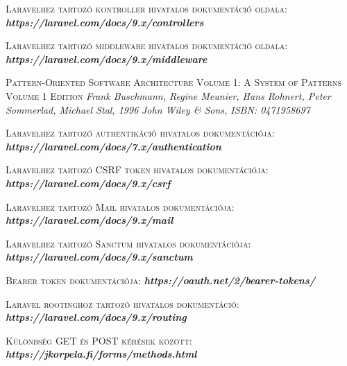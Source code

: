 \documentclass[
]{thesis-ekf}
\theoremstyle{definition}
\theoremstyle{remark}
\begin{document}
\begin{thebibliography}{2}
		\textsc{Laravelhez tartozó kontroller hivatalos dokumentáció oldala:}
		\newline
		\emph{\bf{https://laravel.com/docs/9.x/controllers}}
		
		\textsc{Laravelhez tartozó middleware hivatalos dokumentáció oldala:}
		\newline
		\emph{\bf{https://laravel.com/docs/9.x/middleware}}
		
		\textsc{Pattern-Oriented Software Architecture Volume 1: A System of Patterns Volume 1 Edition}
		\newline
		\emph{Frank Buschmann, Regine Meunier, Hans Rohnert, Peter Sommerlad, Michael Stal, 1996}
		\emph{John Wiley \& Sons, ISBN: 0471958697}
		
		\textsc{Laravelhez tartozó authentikáció hivatalos dokumentációja:}
		\newline
		\emph{\bf{https://laravel.com/docs/7.x/authentication}}
		
		\textsc{Laravelhez tartozó CSRF token hivatalos dokumentációja:}
		\newline
		\emph{\bf{https://laravel.com/docs/9.x/csrf}}
		
		\textsc{Laravelhez tartozó Mail hivatalos dokumentációja:}
		\newline
		\emph{\bf{https://laravel.com/docs/9.x/mail}}
		
		\textsc{Laravelhez tartozó Sanctum hivatalos dokumentációja:}
		\newline
		\emph{\bf{https://laravel.com/docs/9.x/sanctum}}
		
		\textsc{Bearer token dokumentációja:}
		\newline
		\emph{\bf{https://oauth.net/2/bearer-tokens/}}
		
		\textsc{Laravel rootinghoz tartozó hivatalos dokumentáció:}
		\newline
		\emph{\bf{https://laravel.com/docs/9.x/routing}}
		
		
		
		
		
		
		
		
		\textsc{Különbség GET és POST kérések között:}
		\newline
		\emph{\bf{https://jkorpela.fi/forms/methods.html}}
		

\end{thebibliography}
\end{document}
